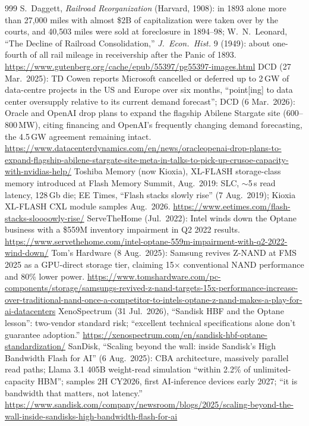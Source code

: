 \begin{thebibliography}{999}
 S.~Daggett, \emph{Railroad Reorganization} (Harvard, 1908): in 1893 alone more than 27,000 miles with almost \$2B of capitalization were taken over by the courts, and 40,503 miles were sold at foreclosure in 1894--98; W.~N.~Leonard, ``The Decline of Railroad Consolidation,'' \emph{J.\ Econ.\ Hist.} 9 (1949): about one-fourth of all rail mileage in receivership after the Panic of 1893. \url{https://www.gutenberg.org/cache/epub/55397/pg55397-images.html}
 DCD (27 Mar.\ 2025): TD Cowen reports Microsoft cancelled or deferred up to 2\,GW of data-centre projects in the US and Europe over six months, ``point[ing] to data center oversupply relative to its current demand forecast''; DCD (6 Mar.\ 2026): Oracle and OpenAI drop plans to expand the flagship Abilene Stargate site (600--800\,MW), citing financing and OpenAI's frequently changing demand forecasting, the 4.5\,GW agreement remaining intact. \url{https://www.datacenterdynamics.com/en/news/oracleopenai-drop-plans-to-expand-flagship-abilene-stargate-site-meta-in-talks-to-pick-up-crusoe-capacity-with-nvidias-help/}
 Toshiba Memory (now Kioxia), XL-FLASH storage-class memory introduced at Flash Memory Summit, Aug.\ 2019: SLC, $\sim$5\,\textmu s read latency, 128\,Gb die; EE Times, ``Flash stacks slowly rise'' (7 Aug.\ 2019); Kioxia XL-FLASH CXL module samples Aug.\ 2026. \url{https://www.eetimes.com/flash-stacks-sloooowly-rise/}
 ServeTheHome (Jul.\ 2022): Intel winds down the Optane business with a \$559M inventory impairment in Q2 2022 results. \url{https://www.servethehome.com/intel-optane-559m-impairment-with-q2-2022-wind-down/}
 Tom's Hardware (8 Aug.\ 2025): Samsung revives Z-NAND at FMS 2025 as a GPU-direct storage tier, claiming 15$\times$ conventional NAND performance and 80\% lower power. \url{https://www.tomshardware.com/pc-components/storage/samsungs-revived-z-nand-targets-15x-performance-increase-over-traditional-nand-once-a-competitor-to-intels-optane-z-nand-makes-a-play-for-ai-datacenters}
 XenoSpectrum (31 Jul.\ 2026), ``Sandisk HBF and the Optane lesson'': two-vendor standard risk; ``excellent technical specifications alone don't guarantee adoption.'' \url{https://xenospectrum.com/en/sandisk-hbf-optane-standardization/}
 SanDisk, ``Scaling beyond the wall: inside Sandisk's High Bandwidth Flash for AI'' (6 Aug.\ 2025): CBA architecture, massively parallel read paths; Llama 3.1 405B weight-read simulation ``within 2.2\% of unlimited-capacity HBM''; samples 2H CY2026, first AI-inference devices early 2027; ``it is bandwidth that matters, not latency.'' \url{https://www.sandisk.com/company/newsroom/blogs/2025/scaling-beyond-the-wall-inside-sandisks-high-bandwidth-flash-for-ai}

\end{thebibliography}
